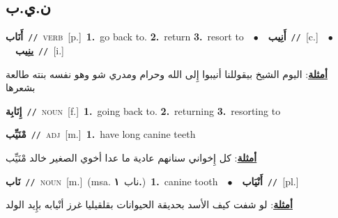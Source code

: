 \documentclass[10pt,a4paper,twoside]{article} %
\begin{document}
\begin{multicols}{2}
\vspace{-3mm}
\subsection*{\color{blue}\foreignlanguage{arabic}{ن.ي.ب}\color{blue}{}} 

{\setlength\topsep{0pt}\textbf{\foreignlanguage{arabic}{أَنَاب}}\ {\color{gray}\texttt{//}\color{black}}\ \textsc{verb}\ [p.]\ \textbf{1.}~go back to.  \textbf{2.}~return  \textbf{3.}~resort to\ \ $\bullet$\ \ \setlength\topsep{0pt}\textbf{\foreignlanguage{arabic}{أَنِيب}}\ {\color{gray}\texttt{//}\color{black}}\ [c.]\ \ $\bullet$\ \ \setlength\topsep{0pt}\textbf{\foreignlanguage{arabic}{ينِيب}}\ {\color{gray}\texttt{//}\color{black}}\ [i.]\  \begin{flushright}\color{gray}\foreignlanguage{arabic}{\textbf{\underline{\foreignlanguage{arabic}{أمثلة}}}: اليوم الشيخ بيقوللنا أنيبوا إِلى الله وحرام ومدري شو وهو نفسه بنته طالعة بشعرها}\end{flushright}\color{black}} \vspace{2mm}

{\setlength\topsep{0pt}\textbf{\foreignlanguage{arabic}{إِنَابِة}}\ {\color{gray}\texttt{//}\color{black}}\ \textsc{noun}\ [f.]\ \textbf{1.}~going back to.  \textbf{2.}~returning  \textbf{3.}~resorting to\ } \vspace{2mm}

{\setlength\topsep{0pt}\textbf{\foreignlanguage{arabic}{مْنَيِّب}}\ {\color{gray}\texttt{//}\color{black}}\ \textsc{adj}\ [m.]\ \textbf{1.}~have long canine teeth\  \begin{flushright}\color{gray}\foreignlanguage{arabic}{\textbf{\underline{\foreignlanguage{arabic}{أمثلة}}}: كل إِخواني سنانهم عادية ما عدا أخوي الصغير خالد مْنَيِّب}\end{flushright}\color{black}} \vspace{2mm}

{\setlength\topsep{0pt}\textbf{\foreignlanguage{arabic}{نَاب}}\ {\color{gray}\texttt{//}\color{black}}\ \textsc{noun}\ [m.]\ \color{gray}(msa. \foreignlanguage{arabic}{ناب}~\foreignlanguage{arabic}{\textbf{١.}})\color{black}\ \textbf{1.}~canine tooth\ \ $\bullet$\ \ \setlength\topsep{0pt}\textbf{\foreignlanguage{arabic}{أَنْيَاب}}\ {\color{gray}\texttt{//}\color{black}}\ [pl.]\  \begin{flushright}\color{gray}\foreignlanguage{arabic}{\textbf{\underline{\foreignlanguage{arabic}{أمثلة}}}: لو شفت كيف الأسد بحديقة الحيوانات بقلقيليا غرز أنْيابه بإِيد الولد}\end{flushright}\color{black}} \vspace{2mm}


\end{multicols}
\end{document}

